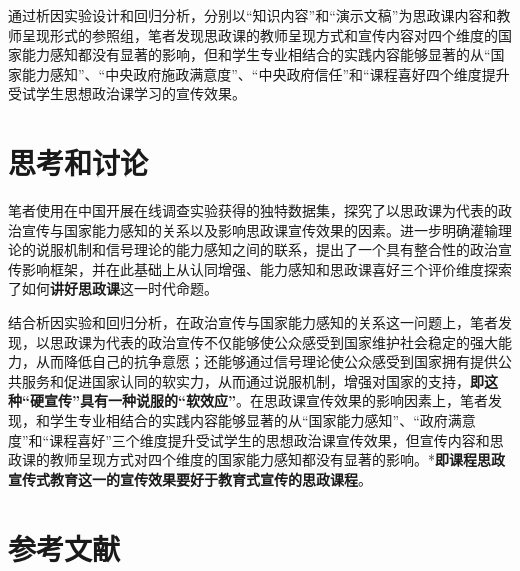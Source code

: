 \documentclass[
  12pt,
]{ctexart}
\begin{document}
通过析因实验设计和回归分析，分别以``知识内容''和``演示文稿''为思政课内容和教师呈现形式的参照组，笔者发现思政课的教师呈现方式和宣传内容对四个维度的国家能力感知都没有显著的影响，但和学生专业相结合的实践内容能够显著的从``国家能力感知''、``中央政府施政满意度''、``中央政府信任''和``课程喜好四个维度提升受试学生思想政治课学习的宣传效果。

\hypertarget{ux601dux8003ux548cux8ba8ux8bba}{%
\section{思考和讨论}\label{ux601dux8003ux548cux8ba8ux8bba}}

笔者使用在中国开展在线调查实验获得的独特数据集，探究了以思政课为代表的政治宣传与国家能力感知的关系以及影响思政课宣传效果的因素。进一步明确灌输理论的说服机制和信号理论的能力感知之间的联系，提出了一个具有整合性的政治宣传影响框架，并在此基础上从认同增强、能力感知和思政课喜好三个评价维度探索了如何\textbf{讲好思政课}这一时代命题。

结合析因实验和回归分析，在政治宣传与国家能力感知的关系这一问题上，笔者发现，以思政课为代表的政治宣传不仅能够使公众感受到国家维护社会稳定的强大能力，从而降低自己的抗争意愿；还能够通过信号理论使公众感受到国家拥有提供公共服务和促进国家认同的软实力，从而通过说服机制，增强对国家的支持，\textbf{即这种``硬宣传''具有一种说服的``软效应''}。在思政课宣传效果的影响因素上，笔者发现，和学生专业相结合的实践内容能够显著的从``国家能力感知''、``政府满意度''和``课程喜好''三个维度提升受试学生的思想政治课宣传效果，但宣传内容和思政课的教师呈现方式对四个维度的国家能力感知都没有显著的影响。*\textbf{即课程思政宣传式教育这一的宣传效果要好于教育式宣传的思政课程}。

\newpage

\hypertarget{ux53c2ux8003ux6587ux732e}{%
\section*{参考文献}\label{ux53c2ux8003ux6587ux732e}}
\end{document}
